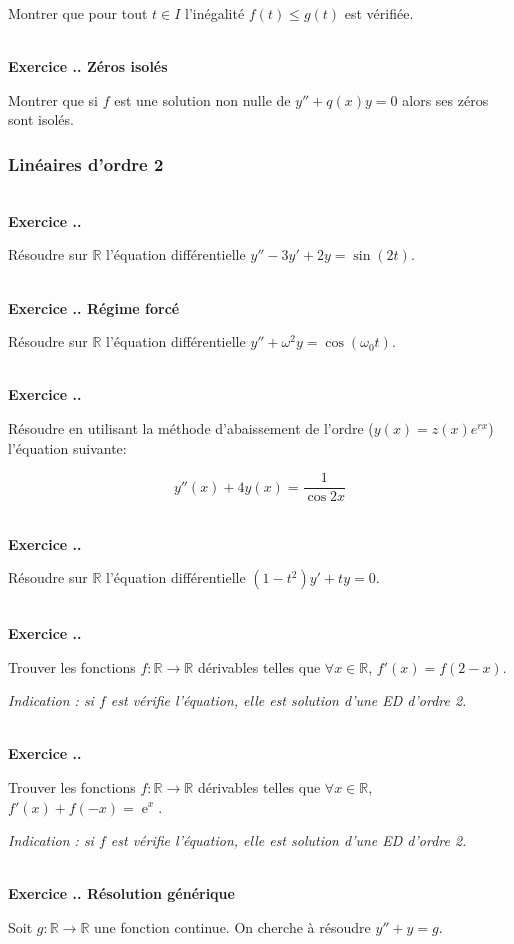 \documentclass{article}
\newcommand{\ex}{{\operatorname{e}}}
\newcommand{\mb}[1]{\mathbb{#1}}
\newcounter{exo}
\newcommand{\exercice}[1][\null]{\textbf{\\ Exercice \thesection.\theexo. #1} \addtocounter{exo}{1}}
\begin{document}
Montrer que pour tout $t \in I$ l'inégalité $f(t) \leq g(t)$ est vérifiée.

\exercice[Zéros isolés]

Montrer que si $f$ est une solution non nulle de $y'' + q(x) y = 0$
alors ses zéros sont isolés. 


\subsubsection{Linéaires d'ordre 2}

\exercice

Résoudre sur $\mb{R}$ l'équation différentielle $y'' - 3y' + 2y = \sin(2t)$.

\exercice[Régime forcé]

Résoudre sur $\mb{R}$ l'équation différentielle $y'' + \omega^2 y = \cos(\omega_0 t)$.

\exercice 

Résoudre en utilisant la méthode d'abaissement 
de l'ordre ($y(x) = z(x) e^{r x}$) l'équation
suivante:

\begin{equation*}
    y''(x) + 4y(x) = \frac{1}{\cos 2x }
\end{equation*}

\exercice

Résoudre sur $\mb{R}$ l'équation différentielle  $(1-t^2)y' + t y = 0$.


\exercice
Trouver les fonctions $f : \mb{R} \rightarrow \mb{R}$ dérivables telles que $\forall x \in \mb{R}$, $f'(x) = f(2-x)$.

\emph{Indication : si $f$ est vérifie l'équation, elle est solution d'une ED d'ordre 2.}



\exercice

Trouver les fonctions $f : \mb{R} \rightarrow \mb{R}$ dérivables telles que $\forall x \in \mb{R}$, $f'(x) + f(-x) = \ex^x$.

\emph{Indication : si $f$ est vérifie l'équation, elle est solution d'une ED d'ordre 2.}



\exercice[Résolution générique]

Soit $g : \mb{R} \rightarrow \mb{R}$ une fonction continue. On cherche à résoudre $y'' + y = g$.
\end{document}
